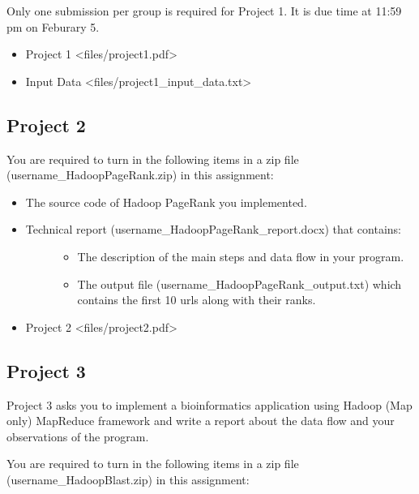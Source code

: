 Only one submission per group is required for Project 1. It is due time
at 11:59 pm on Feburary 5.

\begin{itemize}
\tightlist
\item
  Project 1 \textless{}files/project1.pdf\textgreater{}
\item
  Input Data \textless{}files/project1\_input\_data.txt\textgreater{}
\end{itemize}

\subsection{Project 2}\label{project-2}

You are required to turn in the following items in a zip file
(username\_HadoopPageRank.zip) in this assignment:

\begin{itemize}
\item
  The source code of Hadoop PageRank you implemented.
\item
  \begin{description}
  \item[Technical report (username\_HadoopPageRank\_report.docx) that
  contains:]
  \begin{itemize}
  \tightlist
  \item
    The description of the main steps and data flow in your program.
  \item
    The output file (username\_HadoopPageRank\_output.txt) which
    contains the first 10 urls along with their ranks.
  \end{itemize}
  \end{description}
\item
  Project 2 \textless{}files/project2.pdf\textgreater{}
\end{itemize}

\subsection{Project 3}\label{project-3}

Project 3 asks you to implement a bioinformatics application using
Hadoop (Map only) MapReduce framework and write a report about the data
flow and your observations of the program.

You are required to turn in the following items in a zip file
(username\_HadoopBlast.zip) in this assignment:

